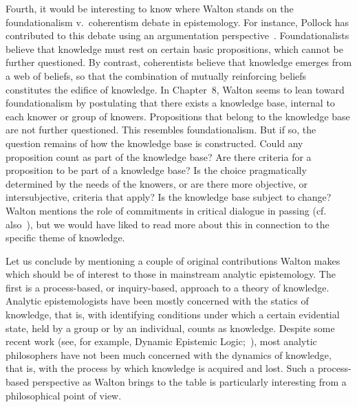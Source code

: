 \documentclass[12pt,a4paper]{article}
\begin{document}
Fourth, it would be interesting to know where Walton stands on the foundationalism v.\ coherentism 
debate in epistemology. For instance, Pollock has contributed to this debate using an argumentation perspective~\citep{pollock1986,pollock1995}. Foundationalists believe that knowledge must rest on certain basic propositions, which cannot be further questioned. By contrast, coherentists believe that knowledge emerges from a web of beliefs, so that 
the combination of mutually reinforcing beliefs constitutes 
the edifice of knowledge. In Chapter~8, %
Walton seems to lean toward foundationalism by postulating that there exists a knowledge base, internal to each knower or group of knowers. 
Propositions that belong to the knowledge base are not further questioned.
This resembles foundationalism. But if so, the question remains of how 
the knowledge base is constructed. Could any proposition count as 
part of the knowledge base? Are there criteria for a proposition 
to be part of a knowledge base? Is the choice pragmatically determined 
by the needs of the knowers, or are there more objective, 
or intersubjective, criteria that apply? Is the knowledge base subject to change? Walton mentions the role of commitments in critical dialogue in passing (cf. also~\citealt{waltonKrabbe1995}), but we would have liked to read more about this in connection to the specific theme of knowledge.


Let us conclude by mentioning 
a couple of original contributions Walton makes 
which should be of interest to those 
in mainstream analytic epistemology. The first is a process-based, or
inquiry-based, approach to a theory of knowledge. Analytic
epistemologists have been mostly concerned with the statics of knowledge, 
that is, with identifying conditions under which a certain
evidential state, held by a group or by an individual, counts as
knowledge. Despite some recent work (see, for example, 
Dynamic Epistemic Logic;~\citealp{baltagRenne2016}), most analytic philosophers have not
been much concerned with the dynamics of knowledge, that is, with
the process by which knowledge is acquired and lost. Such a process-based
perspective as Walton brings to the table is particularly interesting
from a philosophical point of view. 
\end{document}

